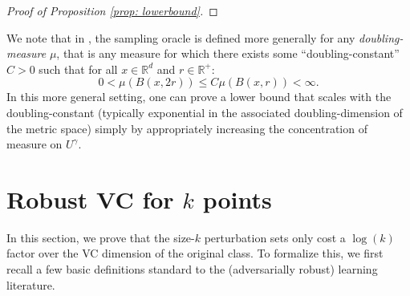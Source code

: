 \begin{proof}[Proof of Proposition \ref{prop: lowerbound}]
 



\end{proof}

We note that in \citet{Urner22}, the sampling oracle is defined more generally for any \textit{doubling-measure} $\mu$, that is any measure for which there exists some ``doubling-constant'' $C>0$ such that for all $x \in \mathbb{R}^d$ and $r \in \mathbb{R}^+$:
\[
0 < \mu(B(x,2r)) \leq C\mu(B(x,r)) < \infty.
\]
In this more general setting, one can prove a lower bound that scales with the doubling-constant (typically exponential in the associated doubling-dimension of the metric space) simply by appropriately increasing the concentration of measure on $U^\gamma$. 


\section{Robust VC for $k$ points}\label{app: robust vc bound}
In this section, we prove that the size-$k$ perturbation sets only cost a $\log(k)$ factor over the VC dimension of the original class. To formalize this, we first recall a few basic definitions standard to the (adversarially robust) learning literature.

